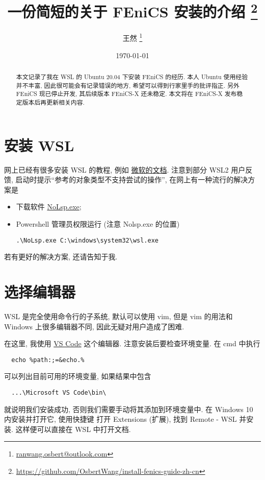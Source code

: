 \documentclass[fontset=founder]{ctexart}
\title{\bfseries 一份简短的关于 FEniCS 安装的介绍%
  \thanks{\url{https://github.com/OsbertWang/install-fenics-guide-zh-cn}}%
}
\author{王然%
  \thanks{\href{mailto:ranwang.osbert@outlook.com}%
    {\ttfamily ranwang.osbert@outlook.com}}%
}
\date{\today}
\begin{document}
  
\maketitle

\begin{abstract}
  本文记录了我在 WSL 的 Ubuntu 20.04 下安装 FEniCS 的经历.
  本人 Ubuntu 使用经验并不丰富,
  因此很可能会有记录错误的地方,
  希望可以得到行家里手的批评指正.
  另外 FEniCS 现已停止开发,
  其后续版本 FEniCS-X 还未稳定.
  本文将在 FEniCS-X 发布稳定版本后再更新相关内容.
\end{abstract}

\section{安装 WSL}

网上已经有很多安装 WSL 的教程,
例如%
\href{https://docs.microsoft.com/zh-cn/windows/wsl/install-win10}{微软的文档}.
注意到部分 WSL2 用户反馈,
启动时提示``参考的对象类型不支持尝试的操作'',
在网上有一种流行的解决方案是
\begin{itemize}
  \item 下载软件 \href{https://www.proxifier.com/tmp/Test20200228/NoLsp.exe}{NoLsp.exe};
  \item Powershell 管理员权限运行 (注意 Nolsp.exe 的位置)
  \begin{lstlisting}[gobble=4]
    .\NoLsp.exe C:\windows\system32\wsl.exe  
  \end{lstlisting}
\end{itemize}
若有更好的解决方案,
还请告知于我.

\section{选择编辑器}

WSL 是完全使用命令行的子系统,
默认可以使用 vim,
但是 vim 的用法和 Windows 上很多编辑器不同,
因此无疑对用户造成了困难.

在这里,
我使用
\href{https://code.visualstudio.com/}{VS Code}
这个编辑器.
注意安装后要检查环境变量.
在 \textsf{cmd} 中执行
\begin{lstlisting}
  echo %path:;=&echo.%
\end{lstlisting}
可以列出目前可用的环境变量,
如果结果中包含
\begin{lstlisting}
  ...\Microsoft VS Code\bin\
\end{lstlisting}
就说明我们安装成功,
否则我们需要手动将其添加到环境变量中.
在 Windows 10 内安装并打开它,
使用快捷键  打开 \textsf{Extensions (扩展)},
找到 \textsf{Remote - WSL} 并安装.
这样便可以直接在 WSL 中打开文档.
\end{document}
